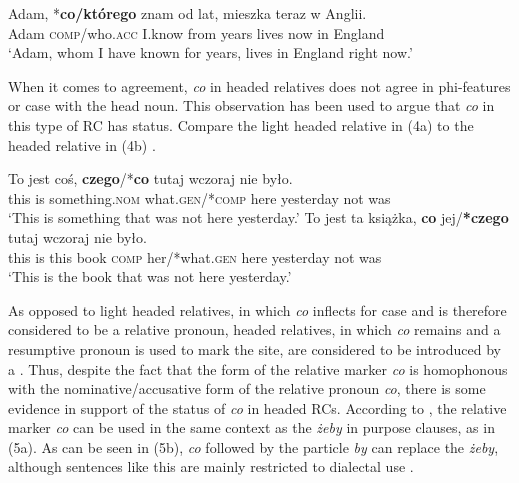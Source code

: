 \documentclass[output=paper]{langsci/langscibook}
\begin{document}
\ea%
    \label{ex:leska:3}
    \gll Adam, *\textbf{co/którego} znam od lat, mieszka teraz w Anglii.    \\
         Adam \textsc{comp}/who\textsc{.acc} I.know from years lives now in England\\
    \glt ‘Adam, whom I have known for years, lives in England right now.’
    \z


When it comes to agreement, \textit{co} in headed relatives does not agree in phi-features or case with the head noun. This observation has been used to argue that \textit{co} in this type of RC has  status. Compare the light headed relative in (4a) to the headed relative in (4b) \citep{Citko2004}.

\ea%
    \label{ex:leska:4}
    \ea
    \gll To   jest   coś,   \textbf{czego}/*\textbf{co}   tutaj  wczoraj    nie   było.   \\
         this   is   something.\textsc{nom}   what.\textsc{gen}/*\textsc{comp}  here  yesterday  not   was\\
    \glt ‘This is something that was not here yesterday.’
    \ex
    \gll To   jest   ta   książka,   \textbf{co}   jej/\textbf{*czego}   tutaj  wczoraj   nie  było.        \\
         this   is   this   book   \textsc{comp}   her/*what.\textsc{gen}   here   yesterday  not  was\\
    \glt ‘This is the book that was not here yesterday.’
    \z
\z

As opposed to light headed relatives, in which \textit{co} inflects for case and is therefore considered to be a relative pronoun, headed relatives, in which \textit{co} remains  and a resumptive pronoun is used to mark the  site, are considered to be introduced by a . Thus, despite the fact that the form of the  relative marker \textit{co} is homophonous with the nominative\slash accusative form of the relative pronoun \textit{co}, there is some evidence in support of the  status of \textit{co} in headed RCs. According to \citet{Bondaruk1995}, the relative marker \textit{co} can be used in the same context as the  \textit{żeby} in purpose clauses, as in (5a). As can be seen in (5b), \textit{co} followed by the particle \textit{by} can replace the  \textit{żeby}, although sentences like this are mainly restricted to dialectal use \citep[35]{Bondaruk1995}.
\end{document}
